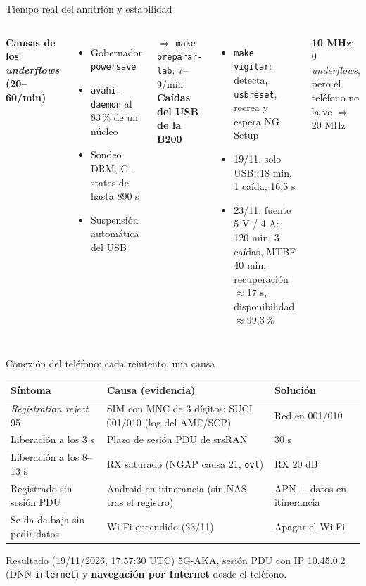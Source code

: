 \documentclass[aspectratio=169,10pt]{beamer}
\begin{document}
\begin{frame}{Tiempo real del anfitrión y estabilidad}
\begin{columns}[T]
\textbf{Causas de los \textit{underflows} (20--60/min)}
\begin{itemize}\small
  \item Gobernador \texttt{powersave}
  \item \texttt{avahi-daemon} al 83\,\% de un núcleo
  \item Sondeo DRM, C-states de hasta 890 \textmu s
  \item Suspensión automática del USB
\end{itemize}
$\Rightarrow$ \texttt{make preparar-lab}: 7--9/min
\textbf{Caídas del USB de la B200}
\begin{itemize}\small
  \item \texttt{make vigilar}: detecta, \texttt{usbreset}, recrea y espera NG Setup
  \item 19/11, solo USB: 18 min, 1 caída, \alert{16,5 s}
  \item 23/11, fuente 5 V / 4 A: 120 min, 3 caídas, MTBF \alert{40 min}, recuperación $\approx$17 s, disponibilidad $\approx$99,3\,\%
\end{itemize}
\textbf{10 MHz}: 0 \textit{underflows}, pero el teléfono no la ve $\Rightarrow$ 20 MHz
\end{columns}
\end{frame}

\begin{frame}{Conexión del teléfono: cada reintento, una causa}
\small
\begin{tabular}{p{4.2cm}p{5.2cm}p{4.2cm}}
\toprule
\textbf{Síntoma} & \textbf{Causa (evidencia)} & \textbf{Solución} \\
\midrule
\textit{Registration reject} 95 & SIM con MNC de 3 dígitos: SUCI 001/010 (log del AMF/SCP) & Red en 001/010 \\
Liberación a los 3 s & Plazo de sesión PDU de srsRAN & 30 s \\
Liberación a los 8--13 s & RX saturado (NGAP causa 21, \texttt{ovl}) & RX 20 dB \\
Registrado sin sesión PDU & Android en itinerancia (sin NAS tras el registro) & APN + datos en itinerancia \\
Se da de baja sin pedir datos & Wi-Fi encendido (23/11) & Apagar el Wi-Fi \\
\bottomrule
\end{tabular}
\vspace{1em}
\begin{alertblock}{Resultado (19/11/2026, 17:57:30 UTC)}
5G-AKA, sesión PDU con IP 10.45.0.2 (DNN \texttt{internet}) y \textbf{navegación por Internet} desde el teléfono.
\end{alertblock}
\end{frame}
\end{document}
